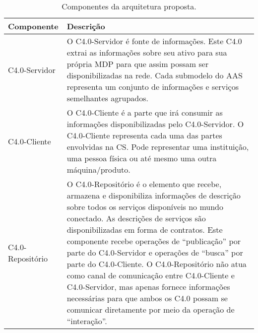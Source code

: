 \begin{table}[htb]
	\centering
	\caption{Componentes da arquitetura proposta.}
	\label{tab:componentes-ws}
	\begin{tabular}{p{3cm}p{12cm}}
		\hline
		\textbf{Componente}
		 & \textbf{Descrição}                                                                                                                                                                                                                                                                                                                                                                                                                                                                                                                                                                               \\

		\hline
		C4.0-Servidor
		 & O C4.0-Servidor é fonte de informações. Este C4.0 extrai as informações sobre seu ativo para sua própria MDP para que assim possam ser disponibilizadas na rede. Cada submodelo do AAS representa um conjunto de informações e serviços semelhantes agrupados.                                                                                                                                                                                                                                                                                                                                   \\

		\hline
		C4.0-Cliente
		 & O C4.0-Cliente é a parte que irá consumir as informações disponibilizadas pelo C4.0-Servidor. O C4.0-Cliente representa cada uma das partes envolvidas na CS. Pode representar uma instituição, uma pessoa física ou até mesmo uma outra máquina/produto.                                                                                                                                                                                                                                                                                                                                        \\

		\hline
		C4.0-Repositório
		 & O C4.0-Repositório é o elemento que recebe, armazena e disponibiliza informações de descrição sobre todos os serviços disponíveis no mundo conectado. As descrições de serviços são disponibilizadas em forma de contratos. Este componente recebe operações de ``publicação'' por parte do C4.0-Servidor e operações de ``busca'' por parte do C4.0-Cliente. O C4.0-Repositório não atua como canal de comunicação entre C4.0-Cliente e C4.0-Servidor, mas apenas fornece informações necessárias para que ambos os C4.0 possam se comunicar diretamente por meio da operação de ``interação''. \\

		\hline
	\end{tabular}
\end{table}

